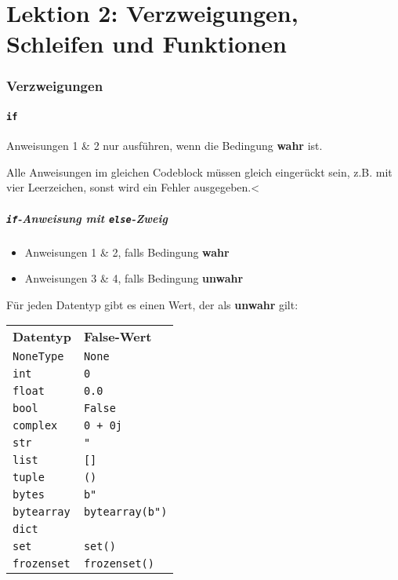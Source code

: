 \part*{Lektion 2: Verzweigungen, Schleifen und Funktionen}
\section{Verzweigungen}
\subsection{\texttt{if}}

Anweisungen 1 \& 2 nur ausführen, wenn die Bedingung \textbf{wahr} ist.\\
\begin{achtung}
	Alle Anweisungen im gleichen Codeblock müssen gleich eingerückt sein, z.B. mit vier Leerzeichen, sonst wird ein Fehler ausgegeben.<
\end{achtung}

\subsubsection{\texttt{if}-Anweisung mit \texttt{else}-Zweig}

\begin{itemize}
	\item Anweisungen 1 \& 2, falls Bedingung \textbf{wahr}
	\item Anweisungen 3 \& 4, falls Bedingung \textbf{unwahr}
\end{itemize}
Für jeden Datentyp gibt es einen Wert, der als \textbf{unwahr} gilt:\\
\begin{tabular}{|l|l|}
	\hline 
	\textbf{Datentyp} &\textbf{False-Wert}\\  
	\texttt{NoneType} &\texttt{None}\\ 
	\texttt{int} &\texttt{0}\\  
	\texttt{float} &\texttt{0.0}\\ 
	\texttt{bool} &\texttt{False}\\  
	\texttt{complex} &\texttt{0 + 0j}\\ 
	\texttt{str} &\texttt{"}\\  
	\texttt{list} &\texttt{[]}\\ 
	\texttt{tuple} &\texttt{()}\\ 
	\texttt{bytes} &\texttt{b"}\\ 
	\texttt{bytearray} &\texttt{bytearray(b")}\\ 
	\texttt{dict} &\texttt{{}}\\ 
	\texttt{set} &\texttt{set()}\\ 
	\texttt{frozenset} &\texttt{frozenset()}\\ 
	\hline 
\end{tabular}

